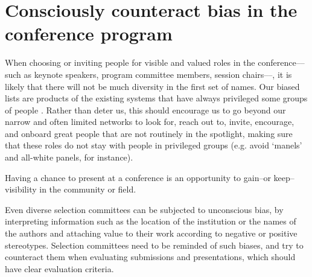 \documentclass[10pt,letterpaper]{article}
\begin{document}
\section{Consciously counteract bias in the conference program}
\label{rule_unbias}

When choosing or inviting people for visible and valued roles in the conference––such as keynote speakers, program committee members, session chairs––, it is likely that there will not be much diversity in the first set of names.
Our biased lists are products of the existing systems that have always privileged some groups of people \cite{dwyerNoticeWhoScience2021,swartzScienceValueDiversity2019,wongBuildDiversityScience2020,dignazioUnicornsJanitorsNinjas2020}. 
Rather than deter us, this should encourage us to go beyond our narrow and often limited networks to look for, reach out to, invite, encourage, and onboard great people that are not routinely in the spotlight, making sure that these roles do not stay with people in privileged groups (e.g. avoid `manels' and all-white panels, for instance).

Having a chance to present at a conference is an opportunity to gain--or keep--visibility in the community or field. %

Even diverse selection committees can be subjected to unconscious bias, by interpreting information such as the location of the institution or the names of the authors and attaching value to their work according to negative or positive stereotypes. 
Selection committees need to be reminded of such biases, and try to counteract them when evaluating submissions and presentations, which should have clear evaluation criteria.
\cite{swartzScienceValueDiversity2019, wongBuildDiversityScience2020}
 
\end{document}

